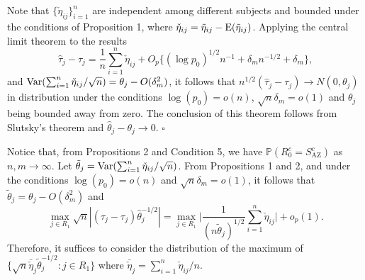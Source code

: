 \documentclass[12pt]{article}
\numberwithin{equation}{section}
\def\nn{\nonumber}
\def\T{{ \mathrm{\scriptscriptstyle T} }}
\def\AZ{{ \mathrm{\scriptscriptstyle AZ} }}
\newcommand{\E}{\rm E}
\newcommand{\V}{\rm Var}
\newcommand{\bW}{{\mathbf W}}
\newcommand{\bXi}{\boldsymbol{\Xi}}
\begin{document}
\medskip
{}
Note that $\{\check{\eta}_{ij}\}_{i = 1}^{n}$ are independent among different subjects and bounded under the conditions of Proposition 1, where $\check{\eta}_{ij} = \tilde{\eta}_{ij} - {\E}(\tilde{\eta}_{ij})$.
Applying the central limit theorem to the results
$$\hat{\tau}_{j} - \tau_{j}
= 
\frac{1}{n}\sum_{i = 1}^{n} \check{\eta}_{ij}
+ 
O_{p}\{(\log p_0)^{1/2}n^{-1} + \delta_m n^{-1/2} + \delta_m\},$$
and ${\V}(\sum_{i = 1}^{n}\check{\eta}_{ij} / \sqrt{n}) = \theta_j - O(\delta_m^2)$, it follows that $n^{1/2}(\hat{\tau}_j - \tau_j) \to N(0, \theta_j)$ in distribution under the conditions $\log (p_0) = o(n)$, $\sqrt{n} \delta_m = o(1)$ and $\theta_j$ being bounded away from zero.
The conclusion of this theorem follows from Slutsky's theorem and $\hat{\theta}_j - \theta_j \to 0$.
$\square$

\medskip
{}
Notice that, from Propositions 2 and Condition 5, we have $\mathbb{P}(R_0^c = S_{\AZ}^c)$ as $n, m \to \infty$.
Let $\tilde{\theta}_j = {\V}(\sum_{i = 1}^{n}\check{\eta}_{ij} / \sqrt{n})$.
From Propositions 1 and 2, and under the conditions $\log(p_0) = o(n)$ and $\sqrt{n} \delta_m = o(1)$, it follows that $\tilde{\theta}_j = \theta_j - O(\delta_m^2)$ and 
$$\max_{j \in R_{1}} \sqrt{n}| (\hat{\tau}_{j} - \tau_j) \hat{\theta}_{j}^{-1/2} | = \max_{j \in R_{1}} \bigg|\frac{1}{(n \tilde{\theta}_{j})^{1/2}}\sum_{i = 1}^{n}\check{\eta}_{ij}\bigg| + o_{p}(1).$$ Therefore, it suffices to consider the distribution of the maximum of $\{\sqrt{n} \bar{\check\eta}_{j}\tilde{\theta}_j^{-1/2}: j \in R_1\}$ where $\bar{\check\eta}_{j} = \sum_{i = 1}^{n} \check{\eta}_{ij} / n$.
\end{document}
